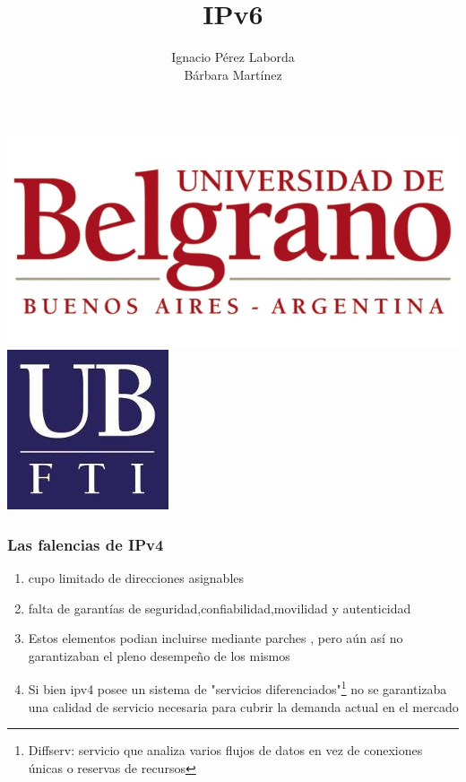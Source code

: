 \documentclass{beamer}
\title[Tecnologia]
{IPv6}
\subtitle{}
\author[Grupo 1] 
{Ignacio P\'erez Laborda\\B\'arbara Mart\'inez}
\institute[UB--FTI] 
{
  Facultad de Tecnolog\'ia Inform\'atica\\
  Universidad de Belgrano
}
\date[\today]
\begin{document}
\begin{frame}

\includegraphics[height=0.2\textheight]{ub2.jpg} \hspace*{6cm}
\includegraphics[height=0.19\textheight]{FTI.jpg}  
\\[-0.1cm]
\titlepage


\end{frame}

\begin{frame}
\frametitle{Las falencias de IPv4}

\begin{enumerate}[$*$]

	\item cupo limitado de direcciones asignables
	\item falta de garant\'ias de seguridad,confiabilidad,movilidad y autenticidad
	\item Estos elementos podian incluirse mediante parches , pero a\'un as\'i no garantizaban el pleno desempeño de los mismos
	\item Si bien ipv4 posee un sistema de "servicios diferenciados"\footnote[1]{Diffserv: servicio que analiza varios flujos de datos en vez de conexiones únicas o reservas de recursos } no se garantizaba una calidad de servicio necesaria para cubrir la demanda actual en el mercado
\end{enumerate}

\end{frame}
\end{document}
